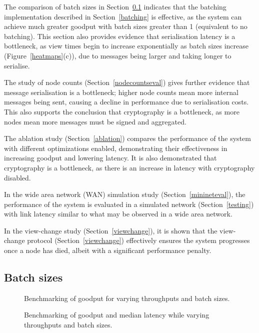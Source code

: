 The comparison of batch sizes in Section~\ref{batchsizeseval} indicates that the batching implementation described in Section~\ref{batching} is effective, as the system can achieve much greater goodput with batch sizes greater than 1 (equivalent to no batching). This section also provides evidence that serialisation latency is a bottleneck, as view times begin to increase exponentially as batch sizes increase (Figure~\ref{heatmaps}(c)), due to messages being larger and taking longer to serialise.

The study of node counts (Section~\ref{nodecountseval}) gives further evidence that message serialisation is a bottleneck; higher node counts mean more internal messages being sent, causing a decline in performance due to serialisation costs. This also supports the conclusion that cryptography is a bottleneck, as more nodes mean more messages must be signed and aggregated.

The ablation study (Section~\ref{ablation}) compares the performance of the system with different optimizations enabled, demonstrating their effectiveness in increasing goodput and lowering latency. It is also demonstrated that cryptography is a bottleneck, as there is an increase in latency with cryptography disabled.

In the wide area network (WAN) simulation study (Section~\ref{minineteval}), the performance of the system is evaluated in a simulated network (Section~\ref{testing}) with link latency similar to what may be observed in a wide area network.

In the view-change study (Section~\ref{viewchange}), it is shown that the view-change protocol (Section~\ref{viewchange}) effectively ensures the system progresses once a node has died, albeit with a significant performance penalty.

\subsection{Batch sizes} \label{batchsizeseval}

\begin{figure}[h!]
\centering
\resizebox{.6\textwidth}{!}{}
\caption{Benchmarking of goodput for varying throughputs and batch sizes.}
\label{throughputgoodputbatch}
\end{figure}

\begin{figure}[h!]
\centering
\resizebox{.6\textwidth}{!}{}
\caption{Benchmarking of goodput and median latency while varying throughputs and batch sizes.}
\label{goodputlatencybatch}
\end{figure}

